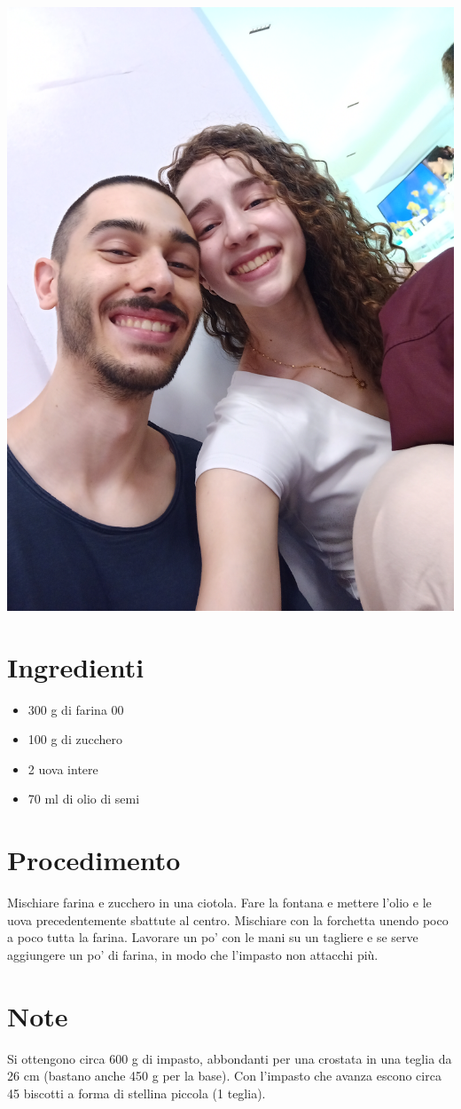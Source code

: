 \documentclass[../../main.tex]{subfiles}
\begin{document}

\noindent
\begin{minipage}[t]{0.3\textwidth}
    \includegraphics[valign=T, width=1\linewidth]{images/test.jpg}  %
    \section*{Ingredienti}
    \begin{itemize}
        \item 300 g di farina 00
        \item 100 g di zucchero
        \item 2 uova intere
        \item 70 ml di olio di semi
    \end{itemize}
\end{minipage}%
\hfill
\begin{minipage}[t]{0.65\textwidth}
\section*{Procedimento}
Mischiare farina e zucchero in una ciotola. Fare la fontana e mettere l'olio e le uova precedentemente sbattute al centro. Mischiare con la forchetta unendo poco a poco tutta la farina. Lavorare un po' con le mani su un tagliere e se serve aggiungere un po' di farina, in modo che l'impasto non attacchi più.
\end{minipage}
\vspace*{\fill}
\section*{Note}	%
Si ottengono circa 600 g di impasto, abbondanti per una crostata in una teglia da 26  cm (bastano anche 450 g per la base). Con l'impasto che avanza escono circa 45 biscotti a forma di stellina piccola (1 teglia).
\vspace*{\fill}
\end{document}
